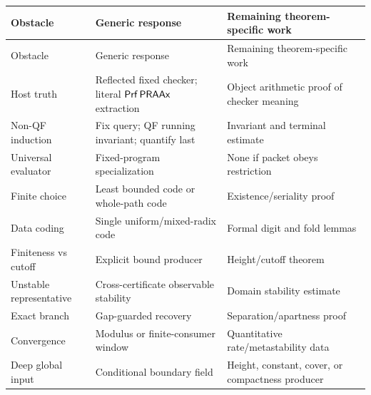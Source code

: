 \begin{longtable}{p{}p{}p{}}
\toprule
Obstacle & Generic response & Remaining theorem-specific work\\
\midrule
\endfirsthead
\toprule
Obstacle & Generic response & Remaining theorem-specific work\\
\midrule
\endhead
Host truth & Reflected fixed checker; literal \(\mathsf{Prf}\,\mathsf{PRAAx}\) extraction & Object arithmetic proof of checker meaning\\
Non-QF induction & Fix query; QF running invariant; quantify last & Invariant and terminal estimate\\
Universal evaluator & Fixed-program specialization & None if packet obeys restriction\\
Finite choice & Least bounded code or whole-path code & Existence/seriality proof\\
Data coding & Single uniform/mixed-radix code & Formal digit and fold lemmas\\
Finiteness vs cutoff & Explicit bound producer & Height/cutoff theorem\\
Unstable representative & Cross-certificate observable stability & Domain stability estimate\\
Exact branch & Gap-guarded recovery & Separation/apartness proof\\
Convergence & Modulus or finite-consumer window & Quantitative rate/metastability data\\
Deep global input & Conditional boundary field & Height, constant, cover, or compactness producer\\
\bottomrule
\end{longtable}
